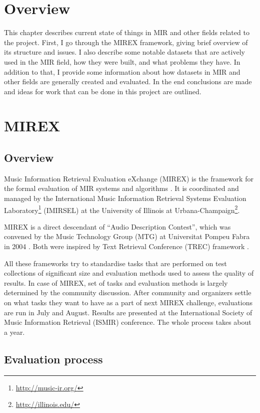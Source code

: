 \section{Overview}

This chapter describes current state of things in MIR and other fields related to the project. First, I go through the MIREX framework, giving brief overview of its structure and issues. I also describe some notable datasets that are actively used in the MIR field, how they were built, and what problems they have. In addition to that, I provide some information about how datasets in MIR and other fields are generally created and evaluated. In the end conclusions are made and ideas for work that can be done in this project are outlined.

\section{MIREX}

\subsection{Overview}

Music Information Retrieval Evaluation eXchange (MIREX) is the framework for the formal evaluation of MIR systems and algorithms \cite{downie2008mirex}. It is coordinated and managed by the International Music Information Retrieval Systems Evaluation Laboratory\footnote{\url{http://music-ir.org/}} (IMIRSEL) at the University of Illinois at Urbana-Champaign\footnote{\url{http://illinois.edu/}}.

MIREX is a direct descendant of ``Audio Description Contest'', which was convened by the Music Technology Group (MTG) at Universitat Pompeu Fabra in 2004 \cite{ismir2004description}. Both were inspired by Text Retrieval Conference (TREC) framework \cite{voorhees2005}.

All these frameworks try to standardise tasks that are performed on test collections of significant size and evaluation methods used to assess the quality of results. In case of MIREX, set of tasks and evaluation methods is largely determined by the community discussion. After community and organizers settle on what tasks they want to have as a part of next MIREX challenge, evaluations are run in July and August. Results are presented at the International Society of Music Information Retrieval (ISMIR) conference. The whole process takes about a year.

\subsection{Evaluation process}


